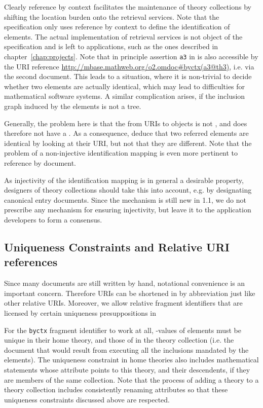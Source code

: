 Clearly reference by context facilitates the maintenance of theory collections by
shifting the location burden onto the retrieval services. Note that the {\omdoc}
specification only uses reference by context to define the identification of
{\omdoc} elements. The actual implementation of retrieval services is not object
of the specification and is left to {\omdoc} applications, such as the ones
described in chapter~\ref{chap:projects}.  Note that in principle assertion
{\tt{a3}} in {} is also accessible by the URI
reference {\url{http://mbase.mathweb.org/o2.omdoc#byctx(a3@th3)}}, i.e. via the
second document. This leads to a situation, where it is non-trivial to decide
whether two elements are actually identical, which may lead to difficulties for
mathematical software systems. A similar complication arises, if the inclusion
graph induced by the {} elements is not a tree.

Generally, the problem here is that the {} from URIs to objects is not
{}, and does therefore not have a {}. As a consequence, deduce that two referred
elements are identical by looking at their URI, but not that they are different.
Note that the problem of a non-injective identification mapping is even more
pertinent to reference by document.

As injectivity of the identification mapping is in general a desirable property,
designers of theory collections should take this into account, e.g. by designating
canonical entry documents. Since the mechanism is still new in {\omdoc}1.1, we do
not prescribe any mechanism for ensuring injectivity, but leave it to the
application developers to form a consensus.

\subsection{Uniqueness Constraints and Relative URI references}\label{sec:relative}

Since many {\omdoc} documents are still written by hand, notational convenience is an
important concern. Therefore URIs can be shortened in {\omdoc} by abbreviation just like
other relative URIs. Moreover, we allow relative fragment identifiers that are licensed by
certain uniqueness presuppositions in {\omdoc}

For the {\tt{byctx}} fragment identifier to work at all, {}-values of
{\omdoc} elements must be unique in their home theory, and those of {} in
the theory collection (i.e. the {\omdoc} document that would result from executing all the
inclusions mandated by the {} elements). The uniqueness constraint in home
theories also includes mathematical statements whose {} attribute
points to this theory, and their descendents, if they are members of the same collection.
Note that the process of adding a theory to a theory collection includes consistently
renaming {} attributes so that these uniqueness constraints discussed
above are respected.

